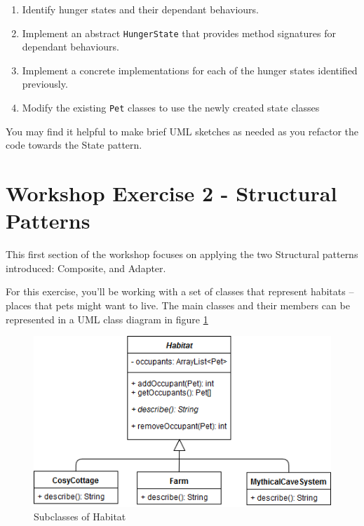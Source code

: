 \documentclass[
]{book}
\providecommand{\tightlist}{%
  \setlength{\itemsep}{0pt}\setlength{\parskip}{0pt}}
\begin{document}
\begin{enumerate}
\def\labelenumi{\arabic{enumi}.}
\tightlist
\item
  Identify hunger states and their dependant behaviours.
\item
  Implement an abstract \texttt{HungerState} that provides method signatures for dependant behaviours.
\item
  Implement a concrete implementations for each of the hunger states identified previously.
\item
  Modify the existing \texttt{Pet} classes to use the newly created state classes
\end{enumerate}

You may find it helpful to make brief UML sketches as needed as you refactor the code towards the State pattern.

\hypertarget{structural}{%
\section{Workshop Exercise 2 - Structural Patterns}\label{structural}}

This first section of the workshop focuses on applying the two Structural patterns introduced: Composite, and Adapter.

For this exercise, you'll be working with a set of classes that represent habitats -- places that pets might want to live. The main classes and their members can be represented in a UML class diagram in figure \ref{fig:habitat-fig}

\begin{figure}

{\centering \includegraphics[width=1\linewidth]{images/Habitat} 

}

\caption{Subclasses of Habitat}\label{fig:habitat-fig}
\end{figure}
\end{document}
